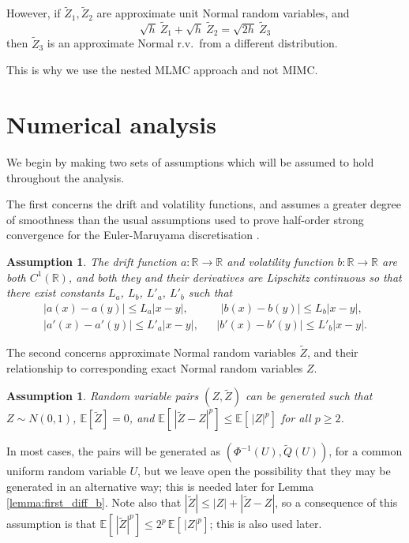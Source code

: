 \documentclass[review]{siamart190516}
\def \RR {{\mathbb{R}}}
\def \EE {{\mathbb{E}}}
\def \tQ {{\widetilde{Q}}}
\def \tZ {{\widetilde{Z}}}
\newtheorem{assumption}[theorem]{Assumption}
\begin{document}
However, if $\tZ_1, \tZ_2$ are approximate unit Normal random variables, 
and 
\[
\sqrt{h}\ \tZ_1 + \sqrt{h}\ \tZ_2 = \sqrt{2h}\ \tZ_3
\]
then $\tZ_3$ is an approximate Normal r.v.~from a different distribution.

This is why we use the nested MLMC approach and not MIMC.

\fi



\section{Numerical analysis}


We begin by making two sets of assumptions which will be assumed to hold
throughout the analysis. 

The first concerns the drift and volatility functions, and assumes a 
greater degree of smoothness than the usual assumptions used to prove 
half-order strong convergence for the Euler-Maruyama discretisation
\cite{kp92}.
\begin{assumption}
\label{assumption:SDE}
The drift function $a: \RR \rightarrow \RR$ and 
volatility function $b: \RR \rightarrow \RR$ are both $C^1(\RR)$, and 
both they and their derivatives are Lipschitz continuous so that there 
exist constants $L_a$, $L_b$, $L'_a$, $L'_b$ such that
\[
\begin{array}{rrr}
|a(x){-}a(y)| \leq L_a |x{-}y|, &&
\ \, |b(x){-}b(y)| \leq L_b |x{-}y|, \\[0.05in]
|a'(x){-}a'(y)| \leq L'_a |x{-}y|, &&
|b'(x){-}b'(y)| \leq L'_b |x{-}y|.
\end{array}
\]
\end{assumption}

The second concerns approximate Normal random variables $\tZ$, 
and their relationship to corresponding exact Normal random 
variables $Z$.

\begin{assumption}
\label{assumption:Z}
Random variable pairs $(Z, \tZ)$ can be generated such that
$Z \sim N(0,1)$, $\EE[\tZ]\!=\!0$, and 
$\EE[\, |\tZ{-}Z|^p ] \leq \EE[\, |Z|^p]$ for all $p\!\geq\! 2$.
\end{assumption}
In most cases, the pairs will be generated as $(\Phi^{-1}(U), \tQ(U))$,
for a common uniform random variable $U$, but we leave open the 
possibility that they may be generated in an alternative way; 
this is needed later for Lemma \ref{lemma:first_diff_b}.
Note also that $|\tZ| \!\leq\! |Z| {+} |\tZ{-}Z|$, so a consequence 
of this assumption is that $\EE[\,|\tZ|^p] \leq 2^p\, \EE[\,|Z|^p]$;
this is also used later.
\end{document}
